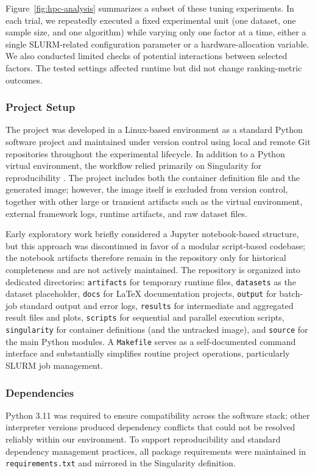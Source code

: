 \documentclass[12pt,a4paper]{article}
\begin{document}
Figure~\ref{fig:hpc-analysis} summarizes a subset of these tuning experiments. In each trial, we repeatedly executed a fixed experimental unit (one dataset, one sample size, and one algorithm) while varying only one factor at a time, either a single SLURM-related configuration parameter or a hardware-allocation variable. We also conducted limited checks of potential interactions between selected factors. The tested settings affected runtime but did not change ranking-metric outcomes.

\subsubsection{Project Setup}
The project was developed in a Linux-based environment as a standard Python software project and maintained under version control using local and remote Git repositories throughout the experimental lifecycle. In addition to a Python virtual environment, the workflow relied primarily on Singularity for reproducibility \cite{singularity}. The project includes both the container definition file and the generated image; however, the image itself is excluded from version control, together with other large or transient artifacts such as the virtual environment, external framework logs, runtime artifacts, and raw dataset files.

Early exploratory work briefly considered a Jupyter notebook-based structure, but this approach was discontinued in favor of a modular script-based codebase; the notebook artifacts therefore remain in the repository only for historical completeness and are not actively maintained. The repository is organized into dedicated directories: \texttt{artifacts} for temporary runtime files, \texttt{datasets} as the dataset placeholder, \texttt{docs} for LaTeX documentation projects, \texttt{output} for batch-job standard output and error logs, \texttt{results} for intermediate and aggregated result files and plots, \texttt{scripts} for sequential and parallel execution scripts, \texttt{singularity} for container definitions (and the untracked image), and \texttt{source} for the main Python modules. A \texttt{Makefile} serves as a self-documented command interface and substantially simplifies routine project operations, particularly SLURM job management.

\subsubsection{Dependencies}
Python 3.11 was required to ensure compatibility across the software stack; other interpreter versions produced dependency conflicts that could not be resolved reliably within our environment. To support reproducibility and standard dependency management practices, all package requirements were maintained in \texttt{requirements.txt} and mirrored in the Singularity definition.
\end{document}

